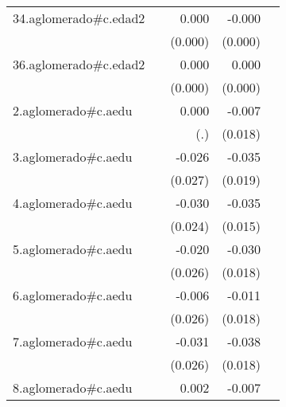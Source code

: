 {\begin{longtable}{l*{4}{D{.}{.}{-1}}}
\addlinespace
34.aglomerado#c.edad2&                     &       0.000         &      -0.000         &                     \\
            &                     &     (0.000)         &     (0.000)         &                     \\
\addlinespace
36.aglomerado#c.edad2&                     &       0.000         &       0.000         &                     \\
            &                     &     (0.000)         &     (0.000)         &                     \\
\addlinespace
2.aglomerado#c.aedu&                     &       0.000         &      -0.007         &                     \\
            &                     &         (.)         &     (0.018)         &                     \\
\addlinespace
3.aglomerado#c.aedu&                     &      -0.026         &      -0.035         &                     \\
            &                     &     (0.027)         &     (0.019)         &                     \\
\addlinespace
4.aglomerado#c.aedu&                     &      -0.030         &      -0.035\sym{*}  &                     \\
            &                     &     (0.024)         &     (0.015)         &                     \\
\addlinespace
5.aglomerado#c.aedu&                     &      -0.020         &      -0.030         &                     \\
            &                     &     (0.026)         &     (0.018)         &                     \\
\addlinespace
6.aglomerado#c.aedu&                     &      -0.006         &      -0.011         &                     \\
            &                     &     (0.026)         &     (0.018)         &                     \\
\addlinespace
7.aglomerado#c.aedu&                     &      -0.031         &      -0.038\sym{*}  &                     \\
            &                     &     (0.026)         &     (0.018)         &                     \\
\addlinespace
8.aglomerado#c.aedu&                     &       0.002         &      -0.007         &                     \\

\end{longtable}}
